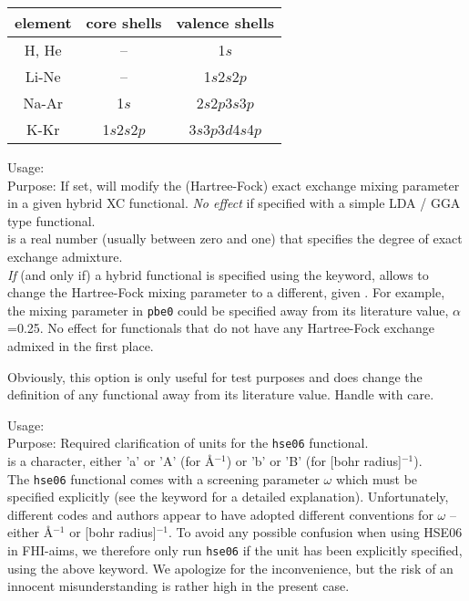 \begin{center}
    \begin{tabular}{ccc}
    	\hline
    	element & core shells & valence shells \\
    	\hline
    	H, He   & --          & 1$s$\\
    	Li-Ne   & --          & 1$s$2$s$2$p$\\
    	Na-Ar   & 1$s$        & 2$s$2$p$3$s$3$p$\\
    	K-Kr    & 1$s$2$s$2$p$& 3$s$3$p$3$d$4$s$4$p$\\
    	\hline
    \end{tabular}
\end{center}


{
 \noindent
 Usage:   \\[1.0ex]
 Purpose: If set, will modify the (Hartree-Fock) exact exchange mixing parameter in a given 
          hybrid XC functional. \emph{No effect} if specified with a
          simple LDA / GGA type functional.\\[1.0ex]
  is a real number (usually between zero and one) that
          specifies the degree of exact exchange admixture.\\
}
\emph{If} (and only if) a hybrid functional is specified using the  keyword, 
 allows to change the Hartree-Fock mixing parameter to 
a different, given . For example, the mixing parameter in \texttt{pbe0}
could be specified away from its literature value, $\alpha$=0.25. No effect for 
 functionals that do not have any Hartree-Fock exchange admixed in the first place.

Obviously, this option
is only useful for test purposes and does change the definition of any functional
away from its literature value. Handle with care.

{
 \noindent
 Usage:   \\[1.0ex]
 Purpose: Required clarification of units for the \texttt{hse06}  functional.\\[1.0ex]
  is a character, either 'a' or 'A' (for {\AA}$^{-1}$) or 'b' or 'B' (for [bohr radius]$^{-1}$).\\
}
The \texttt{hse06} functional comes with a screening parameter $\omega$ which must be specified explicitly
(see the  keyword for a detailed explanation). Unfortunately, different codes and authors
appear to have adopted different conventions for $\omega$ -- either {\AA}$^{-1}$ or [bohr radius]$^{-1}$. 
To avoid any possible confusion when using HSE06 in FHI-aims, we therefore only run \texttt{hse06} if the
unit has been explicitly specified, using the above keyword. We apologize for the inconvenience, but
the risk of an innocent misunderstanding is rather high in the present case.

